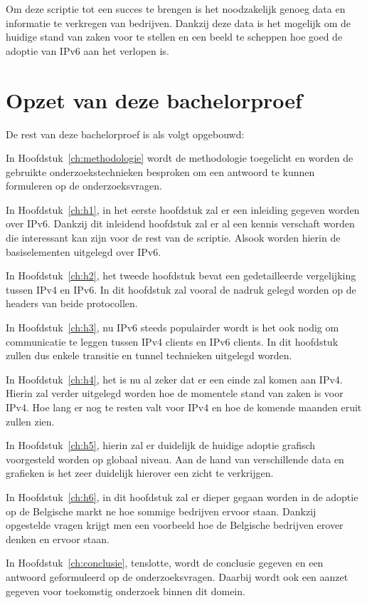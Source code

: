 Om deze scriptie tot een succes te brengen is het noodzakelijk genoeg data en informatie te verkregen van bedrijven. Dankzij deze data is het mogelijk om de huidige stand van zaken voor te stellen en een beeld te scheppen hoe goed de adoptie van IPv6 aan het verlopen is.

\section{Opzet van deze bachelorproef}
\label{sec:opzet-bachelorproef}


De rest van deze bachelorproef is als volgt opgebouwd:

In Hoofdstuk~\ref{ch:methodologie} wordt de methodologie toegelicht en worden de gebruikte onderzoekstechnieken besproken om een antwoord te kunnen formuleren op de onderzoeksvragen.


In Hoofdstuk~\ref{ch:h1}, in het eerste hoofdstuk zal er een inleiding gegeven worden over IPv6. Dankzij dit inleidend hoofdstuk zal er al een kennis verschaft worden die interessant kan zijn voor de rest van de scriptie. Alsook worden hierin de basiselementen uitgelegd over IPv6.

In Hoofdstuk~\ref{ch:h2}, het tweede hoofdstuk bevat een gedetailleerde vergelijking tussen IPv4 en IPv6. In dit hoofdstuk zal vooral de nadruk gelegd worden op de headers van beide protocollen.

In Hoofdstuk~\ref{ch:h3}, nu IPv6 steeds populairder wordt is het ook nodig om communicatie te leggen tussen IPv4 clients en IPv6 clients. In dit hoofdstuk zullen dus enkele transitie en tunnel technieken uitgelegd worden.

In Hoofdstuk~\ref{ch:h4}, het is nu al zeker dat er een einde zal komen aan IPv4. Hierin zal verder uitgelegd worden hoe de momentele stand van zaken is voor IPv4. Hoe lang er nog te resten valt voor IPv4 en hoe de komende maanden eruit zullen zien.

In Hoofdstuk~\ref{ch:h5}, hierin zal er duidelijk de huidige adoptie grafisch voorgesteld worden op globaal niveau. Aan de hand van verschillende data en grafieken is het zeer duidelijk hierover een zicht te verkrijgen.

In Hoofdstuk~\ref{ch:h6}, in dit hoofdstuk zal er dieper gegaan worden in de adoptie op de Belgische markt ne hoe sommige bedrijven ervoor staan. Dankzij opgestelde vragen krijgt men een voorbeeld hoe de Belgische bedrijven erover denken en ervoor staan. 

In Hoofdstuk~\ref{ch:conclusie}, tenslotte, wordt de conclusie gegeven en een antwoord geformuleerd op de onderzoeksvragen. Daarbij wordt ook een aanzet gegeven voor toekomstig onderzoek binnen dit domein.

